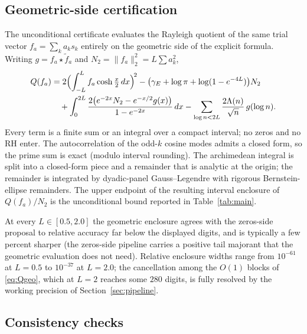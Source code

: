 ﻿\documentclass[11pt]{article}
\begin{document}
\subsection{Geometric-side certification}\label{sec:geocert}

The unconditional certificate evaluates the Rayleigh quotient of the
same trial vector $f_a=\sum_k a_k s_k$ entirely on the geometric side
of the explicit formula.  Writing $g=f_a\star\tilde f_a$ and
$N_2=\|f_a\|_2^2=L\sum a_k^2$,
\begin{equation}\label{eq:Qgeo}
\begin{aligned}
Q(f_a)
&=2\Bigl(\int_{-L}^{L}f_a\cosh\tfrac x2\,dx\Bigr)^{\!2}
-\bigl(\gamma_E+\log\pi+\log(1-e^{-4L})\bigr)N_2\\
&\quad+\int_0^{2L}\frac{2\bigl(e^{-2x}N_2-e^{-x/2}g(x)\bigr)}{1-e^{-2x}}\,dx
-\sum_{\log n<2L}\frac{2\Lambda(n)}{\sqrt n}\,g(\log n).
\end{aligned}
\end{equation}
Every term is a finite sum or an integral over a compact interval; no
zeros and no RH enter.  The autocorrelation of the odd-$k$ cosine
modes admits a closed form, so the prime sum is exact (modulo
interval rounding).  The archimedean integral is split into a
closed-form piece and a remainder that is analytic at the origin;
the remainder is integrated by dyadic-panel Gauss--Legendre with
rigorous Bernstein-ellipse remainders.  The upper endpoint of the
resulting interval enclosure of $Q(f_a)/N_2$ is the unconditional
bound reported in Table~\ref{tab:main}.

At every $L\in[0.5,2.0]$ the geometric enclosure agrees with the
zeros-side proposal to relative accuracy far below the displayed
digits, and is typically a few percent sharper (the zeros-side
pipeline carries a positive tail majorant that the geometric
evaluation does not need).  Relative enclosure widths range from
$10^{-61}$ at $L=0.5$ to $10^{-37}$ at $L=2.0$; the cancellation among
the $O(1)$ blocks of \eqref{eq:Qgeo}, which at $L=2$ reaches some $280$
digits, is fully resolved by the working precision of
Section~\ref{sec:pipeline}.

\subsection{Consistency checks}
\end{document}
